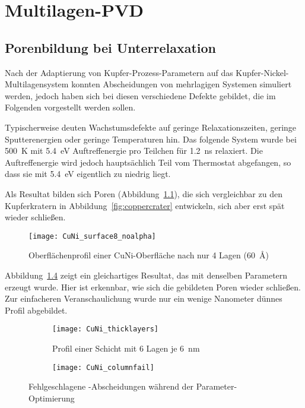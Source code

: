 \chapter{Multilagen-PVD}
\label{appendix:multilayer}

\section{Porenbildung bei Unterrelaxation}

Nach der Adaptierung von Kupfer-Prozess-Parametern auf das Kupfer-Nickel-Multilagensystem konnten Abscheidungen von mehrlagigen Systemen simuliert werden, jedoch haben sich bei diesen verschiedene Defekte gebildet, die im Folgenden vorgestellt werden sollen.

Typischerweise deuten Wachstumsdefekte auf geringe Relaxationszeiten, geringe Sputterenergien oder geringe Temperaturen hin.
Das folgende System wurde bei \SI{500}{\kelvin} mit \SI{5.4}{\electronvolt} Auftreffenergie pro Teilchen für \SI{1.2}{\nano\second} relaxiert.
Die Auftreffenergie wird jedoch hauptsächlich Teil vom Thermostat abgefangen, so dass sie mit \SI{5.4}{\electronvolt} eigentlich zu niedrig liegt.

Als Resultat bilden sich Poren (Abbildung~\ref{fig:multilayer_surfacefail}), die sich vergleichbar zu den Kupferkratern in Abbildung~\ref{fig:coppercrater} entwickeln, sich aber erst spät wieder schließen.

\begin{figure}[h!]
  \centering
  \texttt{[image: CuNi\_surface8\_noalpha]}
  \caption{Oberflächenprofil einer CuNi-Oberfläche nach nur 4 Lagen (\SI{60}{\angstrom})}
  \label{fig:multilayer_surfacefail}
\end{figure}

\clearpage
Abbildung~\ref{fig:multilayer_columnfail} zeigt ein gleichartiges Resultat, das mit denselben Parametern erzeugt wurde.
Hier ist erkennbar, wie sich die gebildeten Poren wieder schließen.
Zur einfacheren Veranschaulichung wurde nur ein wenige Nanometer dünnes Profil abgebildet.

\begin{figure}[h!]
  \captionsetup[subfigure]{singlelinecheck=false}
  \def\subfigwidth{7cm}
  \begin{subfigure}[t]{\subfigwidth}
    \texttt{[image: CuNi\_thicklayers]}
    \caption{Profil einer Schicht mit 6 Lagen je \SI{6}{\nano\meter}}
    \label{fig:multilayer_thickfail}
  \end{subfigure}
  \hfill
  \begin{subfigure}[t]{\subfigwidth}
    \texttt{[image: CuNi\_columnfail]}
    \label{fig:multilayer_columnfail}
  \end{subfigure}
  \caption{Fehlgeschlagene -Abscheidungen während der Parameter-Optimierung}
\end{figure}

